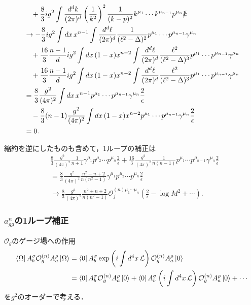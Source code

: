 \begin{align*}
  &\quad + \frac{8}{3} ig^2 \int\frac{d^dk}{(2\pi)^d} \left( \frac{1}{k^2} \right)^2 \frac{1}{(k-p)^2}
  k^{\mu_1} \cdots k^{\mu_{n-1}} p^{\mu_n} \slashed{k} \\
  &\to - \frac{8}{3} ig^2 \int dx \, x^{n-1} \int\frac{d^d\ell}{(2\pi)^d} \frac{1}{(\ell^2-\Delta)^2}
  p^{\mu_1} \cdots p^{\mu_{n-1}} \gamma^{\mu_n} \\
  &\quad + \frac{16}{3} \frac{n-1}{d} ig^2 \int dx \, (1-x) x^{n-2} \int\frac{d^d\ell}{(2\pi)^d} \frac{\ell^2}{(\ell^2-\Delta)^3}
  p^{\mu_1} \cdots p^{\mu_{n-1}} \gamma^{\mu_n} \\
  &\quad + \frac{16}{3} \frac{n-1}{d} ig^2 \int dx \, (1-x) x^{n-2} \int\frac{d^d\ell}{(2\pi)^d} \frac{\ell^2}{(\ell^2-\Delta)^3}
  p^{\mu_1} \cdots p^{\mu_{n-1}} \gamma^{\mu_n} \\
  &= \frac{8}{3} \frac{g^2}{(4\pi)^2} \int dx \, x^{n-1} p^{\mu_1} \cdots p^{\mu_{n-1}} \gamma^{\mu_n} \frac{2}{\epsilon} \\
  &\quad - \frac{8}{3} (n-1) \frac{g^2}{(4\pi)^2} \int dx \, (1-x) x^{n-2} p^{\mu_1} \cdots p^{\mu_{n-1}} \gamma^{\mu_n} \frac{2}{\epsilon} \\
  &= 0 .
\end{align*}

縮約を逆にしたものも含めて，1ループの補正は
\begin{align*}
  & \frac{8}{3} \frac{g^2}{(4\pi)^2} \frac{1}{n+1} \gamma^{\mu_1} p^{\mu_2} \cdots p^{\mu_n} \frac{2}{\epsilon}
  + \frac{16}{3} \frac{g^2}{(4\pi)^2} \frac{1}{n(n-1)} p^{\mu_1} \cdots p^{\mu_{n-1}} \gamma^{\mu_n} \frac{2}{\epsilon} \\
  &= \frac{8}{3} \frac{g^2}{(4\pi)^2} \frac{n^2+n+2}{n(n^2-1)} \gamma^{\mu_1} p^{\mu_2} \cdots p^{\mu_n} \frac{2}{\epsilon} \\
  &\to \frac{8}{3} \frac{g^2}{(4\pi)^2} \frac{n^2+n+2}{n(n^2-1)} \mathcal{O}_f^{(n)\mu_1 \cdots \mu_n}
  \left( \frac{2}{\epsilon} - \log M^2 + \cdots \right) .
\end{align*}

\subsubsection{$a_{gg}^n$の1ループ補正}
$\mathcal{O}_g$のゲージ場への作用
  \begin{align*}
  \bra\Omega A_b^\sigma \mathcal{O}_g^{(n)} A_a^\rho \ket\Omega
  &= \bra{0} A_b^\sigma \exp\left( i \int d^4x \, \mathcal{L}\right) \mathcal{O}_g^{(n)} A_a^\rho \ket{0} \\
  &= \bra{0} A_b^\sigma \mathcal{O}_g^{(n)} A_a^\rho \ket{0} + \bra{0} A_b^\sigma \left(i \int d^4x \, \mathcal{L}\right) \mathcal{O}_g^{(n)} A_a^\rho \ket{0} + \cdots
\end{align*}
を$g^2$のオーダーで考える．

